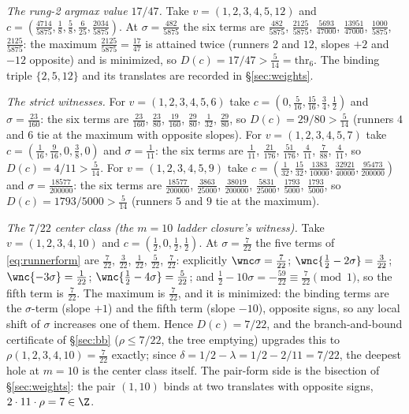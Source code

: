 \emph{The rung-2 argmax value $17/47$.} Take
$v=(1,2,3,4,5,12)$ and
$c=(\tfrac{4714}{5875},\tfrac18,\tfrac58,\tfrac6{25},
\tfrac{2034}{5875})$. At $\sigma=\tfrac{482}{5875}$ the six terms are
$\tfrac{482}{5875}$, $\tfrac{2125}{5875}$, $\tfrac{5693}{47000}$,
$\tfrac{13951}{47000}$, $\tfrac{1000}{5875}$, $\tfrac{2125}{5875}$:
the maximum $\tfrac{2125}{5875}=\tfrac{17}{47}$ is attained twice
(runners $2$ and $12$, slopes $+2$ and $-12$ opposite) and is
minimized, so $D(c)=17/47>\tfrac5{14}=\mathrm{thr}_6$. The binding
triple $\{2,5,12\}$ and its translates are recorded in
\S\ref{sec:weights}.

\emph{The strict witnesses.} For $v=(1,2,3,4,5,6)$ take
$c=(0,\tfrac5{16},\tfrac{15}{16},\tfrac34,\tfrac12)$ and
$\sigma=\tfrac{23}{160}$: the six terms are
$\tfrac{23}{160}$, $\tfrac{23}{80}$, $\tfrac{19}{160}$, $\tfrac{29}{80}$,
$\tfrac1{32}$, $\tfrac{29}{80}$, so $D(c)=29/80>\tfrac5{14}$ (runners
$4$ and $6$ tie at the maximum with opposite slopes). For
$v=(1,2,3,4,5,7)$ take
$c=(\tfrac1{16},\tfrac9{16},0,\tfrac38,0)$ and $\sigma=\tfrac1{11}$:
the six terms are $\tfrac1{11}$, $\tfrac{21}{176}$, $\tfrac{51}{176}$,
$\tfrac4{11}$, $\tfrac7{88}$, $\tfrac4{11}$, so $D(c)=4/11>
\tfrac5{14}$. For $v=(1,2,3,4,5,9)$ take
$c=(\tfrac1{32},\tfrac{15}{32},\tfrac{1383}{10000},
\tfrac{32921}{40000},\tfrac{95473}{200000})$ and
$\sigma=\tfrac{18577}{200000}$: the six terms are
$\tfrac{18577}{200000}$, $\tfrac{3863}{25000}$,
$\tfrac{38019}{200000}$, $\tfrac{5831}{25000}$, $\tfrac{1793}{5000}$,
$\tfrac{1793}{5000}$, so $D(c)=1793/5000>\tfrac5{14}$ (runners $5$ and
$9$ tie at the maximum).

\emph{The $7/22$ center class (the $m=10$ ladder closure's witness).}
Take $v=(1,2,3,4,10)$ and
$c=(\tfrac12,0,\tfrac12,\tfrac12)$. At $\sigma=\tfrac{7}{22}$ the five
terms of \eqref{eq:runnerform} are $\tfrac{7}{22}$, $\tfrac{3}{22}$,
$\tfrac{1}{22}$, $\tfrac{5}{22}$, $\tfrac{7}{22}$: explicitly
$\wnc\sigma=\tfrac7{22}$; $\wnc{\tfrac12-2\sigma}=\tfrac3{22}$;
$\wnc{-3\sigma}=\tfrac1{22}$;
$\wnc{\tfrac12-4\sigma}=\tfrac5{22}$; and
$\tfrac12-10\sigma=-\tfrac{59}{22}\equiv\tfrac7{22}\pmod 1$, so the
fifth term is $\tfrac7{22}$. The maximum is $\tfrac7{22}$, and it is
minimized: the binding terms are the $\sigma$-term (slope $+1$) and the
fifth term (slope $-10$), opposite signs, so any local shift of
$\sigma$ increases one of them. Hence $D(c)=7/22$, and the
branch-and-bound certificate of \S\ref{sec:bb} ($\rho\le7/22$, the
tree emptying) upgrades this to $\rho(1,2,3,4,10)=\tfrac{7}{22}$
exactly; since $\delta=1/2-\lambda=1/2-2/11=7/22$, the deepest hole at
$m=10$ is the center class itself. The pair-form side is the bisection
of \S\ref{sec:weights}: the pair $(1,10)$ binds at two translates with
opposite signs, $2\cdot 11\cdot\rho=7\in\Z$.

